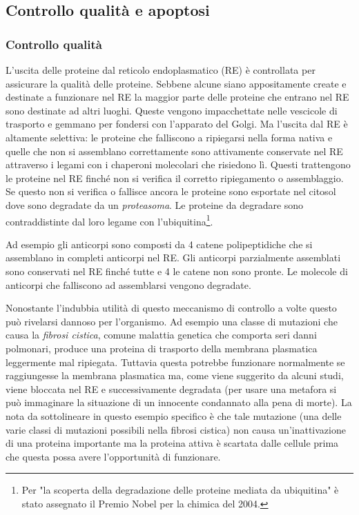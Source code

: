 \subsection{Controllo qualità e apoptosi}
{
\subsubsection{Controllo qualità}
L'uscita delle proteine dal reticolo endoplasmatico (RE) è controllata per assicurare la qualità delle proteine. Sebbene alcune siano appositamente create e destinate a funzionare nel RE la maggior parte delle proteine che entrano nel RE sono destinate ad altri luoghi. Queste vengono impacchettate nelle vescicole di trasporto e gemmano per fondersi con l'apparato del Golgi. Ma l'uscita dal RE è altamente selettiva: le proteine che falliscono a ripiegarsi nella forma nativa e quelle che non si assemblano correttamente sono attivamente conservate nel RE attraverso i legami con i chaperoni molecolari che risiedono lì. Questi trattengono le proteine nel RE finché non si verifica il corretto ripiegamento o assemblaggio. Se questo non si verifica o fallisce ancora le proteine sono esportate nel citosol dove sono degradate da un \textit{proteasoma}. Le proteine da degradare sono contraddistinte dal loro legame con l'ubiquitina\footnote{Per "la scoperta della degradazione delle proteine mediata da ubiquitina" è stato assegnato il Premio Nobel per la chimica del 2004.}.

\par Ad esempio gli anticorpi sono composti da 4 catene polipeptidiche che si assemblano in completi anticorpi nel RE. Gli anticorpi parzialmente assemblati sono conservati nel RE finché tutte e 4 le catene non sono pronte. Le molecole di anticorpi che falliscono ad assemblarsi vengono degradate.


\par Nonostante l'indubbia utilità di questo meccanismo di controllo a volte questo può rivelarsi dannoso per l'organismo. Ad esempio una classe di mutazioni che causa la \textit{fibrosi cistica}, comune malattia genetica che comporta seri danni polmonari, produce una proteina di trasporto della membrana plasmatica leggermente mal ripiegata. Tuttavia questa potrebbe funzionare normalmente se raggiungesse la membrana plasmatica ma, come viene suggerito da alcuni studi\supercite{fraser2015cystic}, viene bloccata nel RE e successivamente degradata\supercite{alberts2018essential} (per usare una metafora si può immaginare la situazione di un innocente condannato alla pena di morte). La nota da sottolineare in questo esempio specifico è che tale mutazione (una delle varie classi di mutazioni possibili nella fibrosi cistica) non causa un'inattivazione di una proteina importante ma la proteina attiva è scartata dalle cellule prima che questa possa avere l'opportunità di funzionare. \\

}
